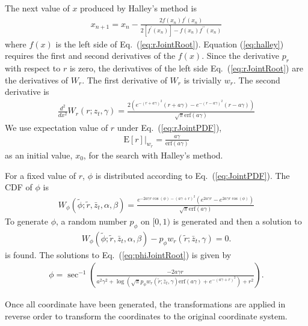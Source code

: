 \documentclass{revtex4}
\begin{document}
  The next value of $x$ produced by Halley's method is
  \begin{align}
    x_{n+1} = x_n - \frac{2 f(x_n) f^\prime(x_n)}{2[f^\prime(x_n)] - f(x_n) f^{\prime\prime}(x_n)}
    \label{eq:halley}
  \end{align}
  where $f(x)$ is the left side of Eq.\ (\ref{eq:rJointRoot}).
  Equation (\ref{eq:halley}) requires the first and second derivatives of the $f(x)$. Since the derivative $p_r$ with respect to $r$ is zero, the derivatives of the left side Eq.\
  (\ref{eq:rJointRoot}) are the derivatives of $W_r$. The first derivative of $W_r$ is trivially $w_r$. The second derivative is
  \begin{align}
   \frac{d^2}{dx^2} W_r(r; z_t, \gamma)  = 
   \frac{2 \left(e^{-(r+a \gamma)^2} (r+a \gamma) - e^{-(r-a \gamma )^2} (r-a \gamma)\right)}{\sqrt{\pi } \text{erf}(a \gamma )}
  \end{align}
  We use expectation value of $r$ under Eq.\ (\ref{eq:rJointPDF}),
  \begin{align}
    \mathrm{E}[r]|_{w_r} = \frac{a \gamma }{\text{erf}(a \gamma )}
  \end{align}
  as an initial value, $x_0$, for the search with Halley's method.

  For a fixed value of $r$, $\phi$ is distributed according to Eq.\ (\ref{eq:JointPDF}). The CDF of $\phi$ is
  \begin{align}
    W_\phi\left(\tilde{\phi} ; \tilde{r}, \bar{z}_t, \alpha, \beta\right) = 
    \frac{e^{-2 a \gamma  r \cos (\phi )-(a \gamma +r)^2} \left(e^{2 a \gamma  r}-e^{2 a \gamma  r \cos (\phi )}\right)}{\sqrt{\pi } \text{erf}(a \gamma )}
  \end{align}
  To generate $\phi$, a random number $p_\phi$ on $[0, 1)$ is generated and then a solution to 
  \begin{align}
    W_\phi\left(\tilde{\phi} ; \tilde{r}, \bar{z}_t, \alpha, \beta\right) - p_\phi w_r\left(\tilde{r}; \bar{z}_t, \gamma \right) = 0.
    \label{eq:phiJointRoot}
  \end{align}
  is found.
  The solutions to Eq.\ (\ref{eq:phiJointRoot}) is given by
  \begin{align}
    \phi = 
    \sec ^{-1}\left(\frac{-2 a \gamma  r}{a^2 \gamma ^2+\log \left(\sqrt{\pi } p_\phi w_r\left(\tilde{r}; \bar{z}_t, \gamma \right) \text{erf}(a \gamma )+e^{-(a \gamma +r)^2}\right)+r^2}\right).
  \end{align}

  Once all coordinate have been generated, the transformations are applied in reverse order to transform the coordinates to the original coordinate system.
\end{document}
